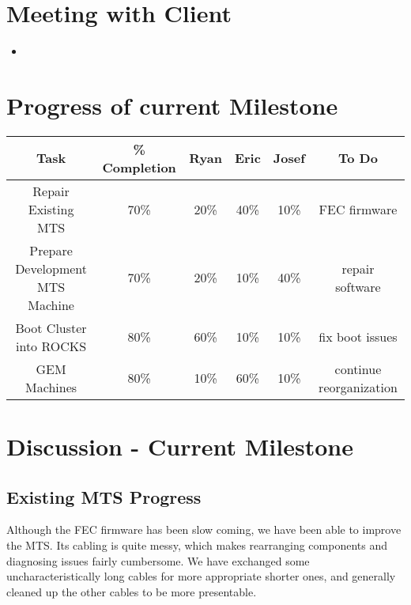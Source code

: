 \documentclass[12pt]{article}
\newcommand\tab[1][1cm]{\hspace*{#1}}
\begin{document}
\section{Meeting with Client}

\begin{itemize}
\item 
\end{itemize}

\section{Progress of current Milestone}

\begin{adjustwidth}{-2cm}{}
  \begin{center}
    \begin{tabular}{|c|c|c|c|c|c|}
      \hline
      Task & \% Completion & Ryan & Eric & Josef & To Do \\
      \hline
      Repair Existing MTS & 70\% & 20\% & 40\% & 10\% & FEC firmware \\
      Prepare Development MTS Machine & 70\% & 20\% & 10\% & 40\% & repair
                                                                    software \\
      Boot Cluster into ROCKS & 80\% & 60\% & 10\% & 10\% & fix boot issues \\
      GEM Machines & 80\% & 10\% & 60\% & 10\% & continue reorganization \\
      \hline   
    \end{tabular}
  \end{center}
\end{adjustwidth}

\section{Discussion - Current Milestone}

\subsection{Existing MTS Progress}

\tab Although the FEC firmware has been slow coming, we have been able to improve the
MTS. Its cabling is quite messy, which makes rearranging components and
diagnosing issues fairly cumbersome. We have exchanged some uncharacteristically
long cables for more appropriate shorter ones, and generally cleaned up the
other cables to be more presentable.
\end{document}
